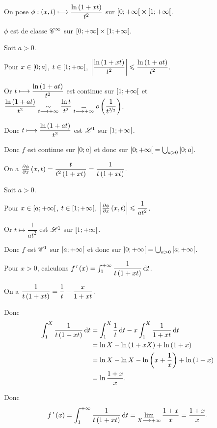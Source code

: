 \begin{corr}
On pose \(\phi:\left(x,t\right)\longmapsto\dfrac{\ln\left(1+xt\right)}{t^2}\) sur \(\left[0;+\infty\right[\times\left[1;+\infty\right[\).

\(\phi\) est de classe \(\mathscr{C}^{\infty}\) sur \(\left[0;+\infty\right[\times\left[1;+\infty\right[\).

Soit \(a>0\).

Pour \(x\in\left[0;a\right]\), \(t\in\left[1;+\infty\right[\), \(\left\lvert\dfrac{\ln\left(1+xt\right)}{t^2}\right\rvert\leqslant\dfrac{\ln\left(1+at\right)}{t^2}\).

Or \(t\longmapsto\dfrac{\ln\left(1+at\right)}{t^2}\) est continue sur \(\left[1;+\infty\right[\) et \(\dfrac{\ln\left(1+at\right)}{t^2}\underset{t\longrightarrow+\infty}{\sim}\dfrac{\ln t}{t^2}\underset{t\longrightarrow+\infty}{=}o\left(\dfrac{1}{t^{\nicefrac{3}{2}}}\right)\).

Donc \(t\longmapsto\dfrac{\ln\left(1+at\right)}{t^2}\) est \(\integ{1}{}{}\) sur \(\left[1;+\infty\right[\).

Donc \(f\) est continue sur \(\left[0;a\right]\) et donc sur \(\left[0;+\infty\right[=\bigcup_{a>0}\left[0;a\right]\).

On a \(\pdv{\phi}{x}\left(x,t\right)=\dfrac{t}{t^2\left(1+xt\right)}=\dfrac{1}{t\left(1+xt\right)}\).

Soit \(a>0\).

Pour \(x\in\left[a;+\infty\right[\), \(t\in\left[1;+\infty\right[\), \(\left\lvert\pdv{\phi}{x}\left(x,t\right)\right\rvert\leqslant\dfrac{1}{at^2}\).

Or \(t\mapsto\dfrac{1}{at^2}\) est \(\integ{1}{}{}\) sur \(\left[1;+\infty\right[\).

Donc \(f\) est \(\mathscr{C}^{1}\) sur \(\left[a;+\infty\right[\) et donc sur \(\left]0;+\infty\right[=\bigcup_{a>0}\left[a;+\infty\right[\).

Pour \(x>0\), calculons \(f\prim\paren{x}=\int_1^{\pinf}\dfrac{1}{t\paren{1+xt}}\odif{t}\).

On a \(\dfrac{1}{t\left(1+xt\right)}=\dfrac{1}{t}-\dfrac{x}{1+xt}\).

Donc \[\begin{aligned}
\int_1^X\dfrac{1}{t\paren{1+xt}}\odif{t}&=\int_1^X\dfrac{1}{t}\odif{t}-x\int_1^X\dfrac{1}{1+xt}\odif{t} \\
&=\ln X-\ln\paren{1+xX}+\ln\paren{1+x} \\
&=\ln X-\ln X-\ln\paren{x+\dfrac{1}{x}}+\ln\paren{1+x} \\
&=\ln\dfrac{1+x}{x}.
\end{aligned}\]

Donc \[f\prim\paren{x}=\int_1^{\pinf}\dfrac{1}{t\paren{1+xt}}\odif{t}=\lim_{X\to\pinf}\dfrac{1+x}{x}=\dfrac{1+x}{x}.\]
\end{corr}

